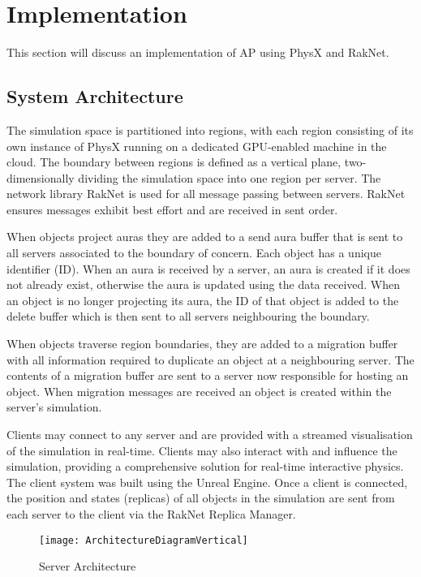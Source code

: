 \chapter{Implementation}
This section will discuss an implementation of AP using PhysX and RakNet.

\section{System Architecture}
The simulation space is partitioned into regions, with each region consisting of its own instance of PhysX running on a dedicated GPU-enabled machine in the cloud. The boundary between regions is defined as a vertical plane, two-dimensionally dividing the simulation space into one region per server. The network library RakNet is used for all message passing between servers. RakNet ensures messages exhibit best effort and are received in sent order.

When objects project auras they are added to a send aura buffer that is sent to all servers associated to the boundary of concern. Each object has a unique identifier (ID). When an aura is received by a server, an aura is created if it does not already exist, otherwise the aura is updated using the data received. When an object is no longer projecting its aura, the ID of that object is added to the delete buffer which is then sent to all servers neighbouring the boundary.

When objects traverse region boundaries, they are added to a migration buffer with all information required to duplicate an object at a neighbouring server. The contents of a migration buffer are sent to a server now responsible for hosting an object. When migration messages are received an object is created within the server's simulation.

Clients may connect to any server and are provided with a streamed visualisation of the simulation in real-time. Clients may also interact with and influence the simulation, providing a comprehensive solution for real-time interactive physics. The client system was built using the Unreal Engine. Once a client is connected, the position and states (replicas) of all objects in the simulation are sent from each server to the client via the RakNet Replica Manager.

\begin{figure}[!t]
	\centering
	\texttt{[image: ArchitectureDiagramVertical]}
	\caption{Server Architecture}
	\label{fig_stack}
\end{figure}

